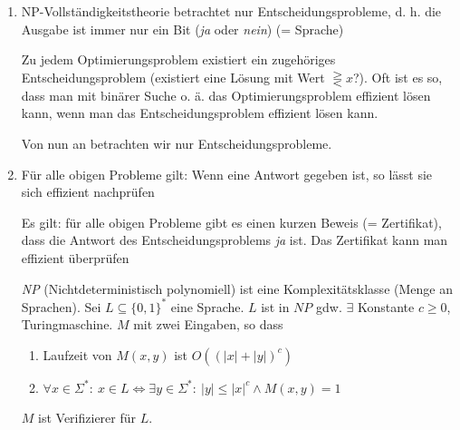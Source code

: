 \begin{enumerate}
 \item NP-Vollständigkeitstheorie betrachtet nur Entscheidungsprobleme, d. h. die Ausgabe ist immer nur ein Bit (\emph{ja} oder \emph{nein}) (= Sprache)
 
 Zu jedem Optimierungsproblem existiert ein zugehöriges Entscheidungsproblem (existiert eine Lösung mit Wert $\gtreqless x$?). Oft ist es so, dass man mit binärer Suche o. ä. das Optimierungsproblem effizient lösen kann, wenn man das Entscheidungsproblem effizient lösen kann.

 Von nun an betrachten wir nur Entscheidungsprobleme.
 \item Für alle obigen Probleme gilt: Wenn eine Antwort gegeben ist, so lässt sie sich effizient nachprüfen
 
 Es gilt: für alle obigen Probleme gibt es einen kurzen Beweis (= Zertifikat), dass die Antwort des Entscheidungsproblems \emph{ja} ist. Das Zertifikat kann man effizient überprüfen
 
 \Defi \emph{NP} (Nichtdeterministisch polynomiell) ist eine Komplexitätsklasse (Menge an Sprachen).
     Sei $L \subseteq \{0,1\}^*$ eine Sprache. $L$ ist in $NP$ gdw. $\exists$ Konstante $c \geq 0$, Turingmaschine. $M$ mit zwei Eingaben, so dass
     \renewcommand{\labelenumii}{(\theenumii)}
     \renewcommand{\theenumii}{\roman{enumii}}
     \begin{enumerate}
     \item Laufzeit von $M(x,y)$ ist $O((|x|+|y|)^c)$
     \item $\forall x \in \Sigma^*{:}\ x \in L \Leftrightarrow \exists y \in \Sigma^*{:}\ |y| \leq |x|^c \land M(x,y) = 1$
     \end{enumerate}
     $M$ ist Verifizierer für $L$.
\end{enumerate}

